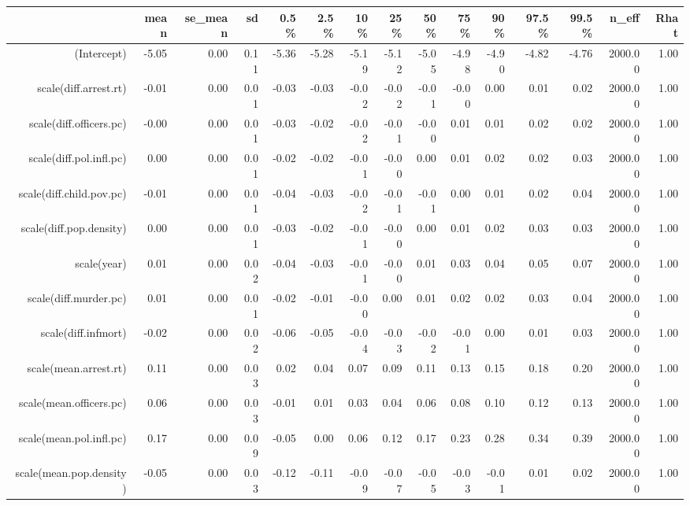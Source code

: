 \begin{table}[ht]
\centering
\begin{tabular}{rrrrrrrrrrrrrrr}
  \hline
 & mean & se\_mean & sd & 0.5\% & 2.5\% & 10\% & 25\% & 50\% & 75\% & 90\% & 97.5\% & 99.5\% & n\_eff & Rhat \\ 
  \hline
(Intercept) & -5.05 & 0.00 & 0.11 & -5.36 & -5.28 & -5.19 & -5.12 & -5.05 & -4.98 & -4.90 & -4.82 & -4.76 & 2000.00 & 1.00 \\ 
  scale(diff.arrest.rt) & -0.01 & 0.00 & 0.01 & -0.03 & -0.03 & -0.02 & -0.02 & -0.01 & -0.00 & 0.00 & 0.01 & 0.02 & 2000.00 & 1.00 \\ 
  scale(diff.officers.pc) & -0.00 & 0.00 & 0.01 & -0.03 & -0.02 & -0.02 & -0.01 & -0.00 & 0.01 & 0.01 & 0.02 & 0.02 & 2000.00 & 1.00 \\ 
  scale(diff.pol.infl.pc) & 0.00 & 0.00 & 0.01 & -0.02 & -0.02 & -0.01 & -0.00 & 0.00 & 0.01 & 0.02 & 0.02 & 0.03 & 2000.00 & 1.00 \\ 
  scale(diff.child.pov.pc) & -0.01 & 0.00 & 0.01 & -0.04 & -0.03 & -0.02 & -0.01 & -0.01 & 0.00 & 0.01 & 0.02 & 0.04 & 2000.00 & 1.00 \\ 
  scale(diff.pop.density) & 0.00 & 0.00 & 0.01 & -0.03 & -0.02 & -0.01 & -0.00 & 0.00 & 0.01 & 0.02 & 0.03 & 0.03 & 2000.00 & 1.00 \\ 
  scale(year) & 0.01 & 0.00 & 0.02 & -0.04 & -0.03 & -0.01 & -0.00 & 0.01 & 0.03 & 0.04 & 0.05 & 0.07 & 2000.00 & 1.00 \\ 
  scale(diff.murder.pc) & 0.01 & 0.00 & 0.01 & -0.02 & -0.01 & -0.00 & 0.00 & 0.01 & 0.02 & 0.02 & 0.03 & 0.04 & 2000.00 & 1.00 \\ 
  scale(diff.infmort) & -0.02 & 0.00 & 0.02 & -0.06 & -0.05 & -0.04 & -0.03 & -0.02 & -0.01 & 0.00 & 0.01 & 0.03 & 2000.00 & 1.00 \\ 
  scale(mean.arrest.rt) & 0.11 & 0.00 & 0.03 & 0.02 & 0.04 & 0.07 & 0.09 & 0.11 & 0.13 & 0.15 & 0.18 & 0.20 & 2000.00 & 1.00 \\ 
  scale(mean.officers.pc) & 0.06 & 0.00 & 0.03 & -0.01 & 0.01 & 0.03 & 0.04 & 0.06 & 0.08 & 0.10 & 0.12 & 0.13 & 2000.00 & 1.00 \\ 
  scale(mean.pol.infl.pc) & 0.17 & 0.00 & 0.09 & -0.05 & 0.00 & 0.06 & 0.12 & 0.17 & 0.23 & 0.28 & 0.34 & 0.39 & 2000.00 & 1.00 \\ 
  scale(mean.pop.density) & -0.05 & 0.00 & 0.03 & -0.12 & -0.11 & -0.09 & -0.07 & -0.05 & -0.03 & -0.01 & 0.01 & 0.02 & 2000.00 & 1.00 \\ 

\end{tabular}
\end{table}
